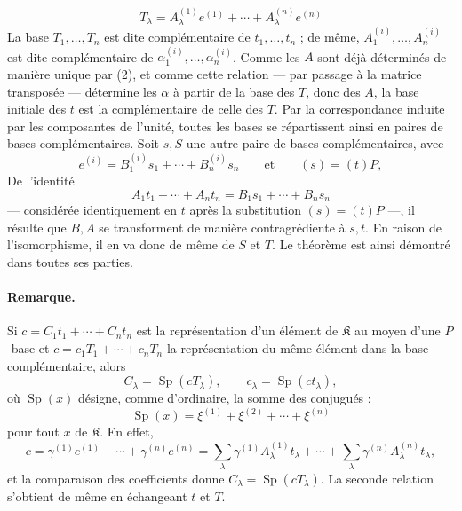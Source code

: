 \[
T_\lambda=A_\lambda^{(1)}e^{(1)}+\cdots+A_\lambda^{(n)}e^{(n)}
\]
La base $T_1,\ldots,T_n$ est dite complémentaire de $t_1,\ldots,t_n$ ; de même, $A_1^{(i)},\ldots,A_n^{(i)}$ est dite complémentaire de $\alpha_1^{(i)},\ldots,\alpha_n^{(i)}$. Comme les $A$ sont déjà déterminés de manière unique par (2), et comme cette relation --- par passage à la matrice transposée --- détermine les $\alpha$ à partir de la base des $T$, donc des $A$, la base initiale des $t$ est la complémentaire de celle des $T$. Par la correspondance induite par les composantes de l'unité, toutes les bases se répartissent ainsi en paires de bases complémentaires. Soit $s,S$ une autre paire de bases complémentaires, avec
\[
e^{(i)}=B_1^{(i)}s_1+\cdots+B_n^{(i)}s_n
\qquad\text{et}\qquad (s)=(t)P,
\]
De l'identité
\[
A_1t_1+\cdots+A_nt_n=B_1s_1+\cdots+B_ns_n
\]
--- considérée identiquement en $t$ après la substitution $(s)=(t)P$ ---, il résulte que $B,A$ se transforment de manière contragrédiente à $s,t$. En raison de l'isomorphisme, il en va donc de même de $S$ et $T$. Le théorème est ainsi démontré dans toutes ses parties.

\paragraph{Remarque.}
Si $c=C_1t_1+\cdots+C_nt_n$ est la représentation d'un élément de $\mathfrak K$ au moyen d'une $P$-base et $c=c_1T_1+\cdots+c_nT_n$ la représentation du même élément dans la base complémentaire, alors
\[
C_\lambda=\operatorname{Sp}(cT_\lambda),
\qquad c_\lambda=\operatorname{Sp}(ct_\lambda),
\]
où $\operatorname{Sp}(x)$ désigne, comme d'ordinaire, la somme des conjugués :
\[
\operatorname{Sp}(x)=\xi^{(1)}+\xi^{(2)}+\cdots+\xi^{(n)}
\]
pour tout $x$ de $\mathfrak K$. En effet,
\[
c=\gamma^{(1)}e^{(1)}+\cdots+\gamma^{(n)}e^{(n)}
=\sum_\lambda\gamma^{(1)}A_\lambda^{(1)}t_\lambda+
\cdots+\sum_\lambda\gamma^{(n)}A_\lambda^{(n)}t_\lambda,
\]
et la comparaison des coefficients donne $C_\lambda=\operatorname{Sp}(cT_\lambda)$. La seconde relation s'obtient de même en échangeant $t$ et $T$.

